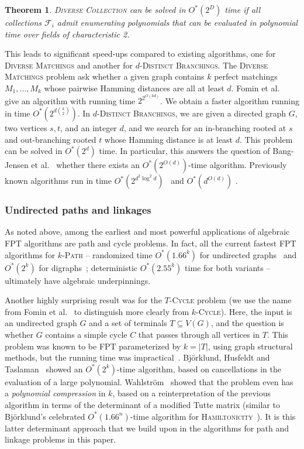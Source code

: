 \documentclass[10pt,a4paper]{article}
\newtheorem{theorem}{Theorem}[section]
\newcommand{\cF}{\ensuremath{\mathcal F}\xspace}
\begin{document}
\begin{theorem}
  \textsc{Diverse Collection} can be solved in $O^*(2^{D})$ time if all collections $\cF_i$ admit enumerating polynomials that can be evaluated in polynomial time over fields of characteristic 2.
\end{theorem}

This leads to significant speed-ups compared to existing algorithms, one for \textsc{Diverse Matchings} and another for \textsc{$d$-Distinct Branchings}.
The \textsc{Diverse Matchings} problem ask whether a given graph contains $k$ perfect matchings $M_1, \dots, M_k$ whose pairwise Hamming distances are all at least $d$.
Fomin et al.~\cite{FominGJPS24} give an algorithm with running time $2^{2^{O(kd)}}$.
We obtain a faster algorithm running in time $O^*(2^{d \binom{k}{2}})$.
In \textsc{$d$-Distinct Branchings}, we are given a directed graph $G$, two vertices $s, t$, and an integer $d$, and we search for an in-branching rooted at $s$ and out-branching rooted $t$ whose Hamming distance is at least $d$.
This problem can be solved in $O^*(2^d)$ time.
In particular, this answers the question of Bang-Jensen et al.~\cite{Bang-JensenK021} whether there exists an $O^*(2^{O(d)})$-time algorithm.
Previously known algorithms run in time $O^*(2^{d^2 \log^2 d})$~\cite{GutinRW18} and $O^*(d^{O(d)})$ \cite{Bang-JensenK021}.

\subsubsection{Undirected paths and linkages}
\label{ssec:linkage}
As noted above, among the earliest and most powerful
applications of algebraic FPT algorithms are path and cycle
problems. In fact, all the current fastest FPT algorithms for
\textsc{$k$-Path} -- randomized time $O^*(1.66^k)$ for undirected
graphs~\cite{BjorklundHKK17narrow} and $O^*(2^k)$ for
digraphs~\cite{Williams09IPL}; deterministic $O^*(2.55^k)$ time for
both variants \cite{Tsur19b} -- ultimately have algebraic underpinnings.

Another highly surprising result was for the \textsc{$T$-Cycle} problem
(we use the name from Fomin et al.~\cite{FominGKSS24} to
distinguish more clearly from \textsc{$k$-Cycle}).
Here, the input is an undirected graph $G$ and a set of terminals $T
\subseteq V(G)$, and the question is whether $G$ contains a simple
cycle $C$ that passes through all vertices in $T$. 
This problem was known to be FPT parameterized by $k=|T|$,
using graph structural methods, but the running time was 
impractical~\cite{Kawarabayashi08}. Bj\"orklund, Husfeldt and
Taslaman~\cite{BjorklundHT12soda} showed an $O^*(2^k)$-time algorithm,
based on cancellations in the evaluation of a large polynomial. 
Wahlstr\"om~\cite{Wahlstrom13STACS} showed that the problem even has a
\emph{polynomial compression} in $k$, based on a reinterpretation of
the previous algorithm in terms of the determinant of a modified Tutte
matrix (similar to Bj\"orklund's celebrated $O^*(1.66^n)$-time
algorithm for \textsc{Hamiltonicity}~\cite{Bjorklund14detsum}). 
It is this latter determinant approach that we build upon in the
algorithms for path and linkage problems in this paper. 
\end{document}
